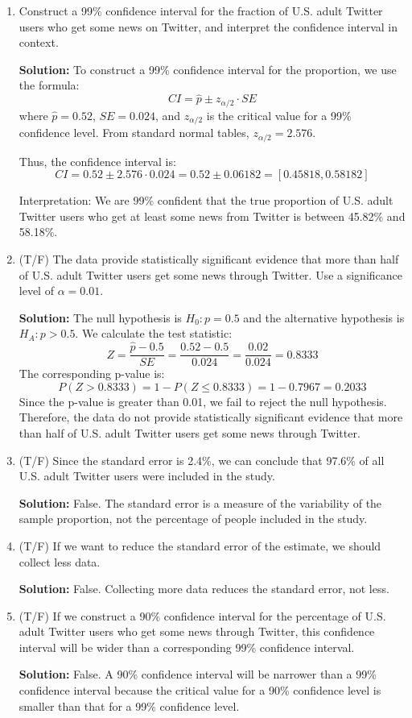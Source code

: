 \documentclass[12pt]{article}
\begin{document}
\begin{enumerate}
    \item Construct a 99\% confidence interval for the fraction of U.S. adult Twitter users who get some news on Twitter, and interpret the confidence interval in context.

\textbf{Solution:}
To construct a 99\% confidence interval for the proportion, we use the formula:
\[
CI = \hat{p} \pm z_{\alpha/2} \cdot SE
\]
where \( \hat{p} = 0.52 \), \( SE = 0.024 \), and \( z_{\alpha/2} \) is the critical value for a 99\% confidence level. From standard normal tables, \( z_{\alpha/2} = 2.576 \).

Thus, the confidence interval is:
\[
CI = 0.52 \pm 2.576 \cdot 0.024 = 0.52 \pm 0.06182 = [0.45818, 0.58182]
\]

Interpretation: We are 99\% confident that the true proportion of U.S. adult Twitter users who get at least some news from Twitter is between 45.82\% and 58.18\%.

\item (T/F) The data provide statistically significant evidence that more than half of U.S. adult Twitter users get some news through Twitter. Use a significance level of \( \alpha = 0.01 \).

\textbf{Solution:}
The null hypothesis is \( H_0: p = 0.5 \) and the alternative hypothesis is \( H_A: p > 0.5 \). We calculate the test statistic:
\[
Z = \frac{\hat{p} - 0.5}{SE} = \frac{0.52 - 0.5}{0.024} = \frac{0.02}{0.024} = 0.8333
\]
The corresponding p-value is:
\[
P(Z > 0.8333) = 1 - P(Z \leq 0.8333) = 1 - 0.7967 = 0.2033
\]
Since the p-value is greater than 0.01, we fail to reject the null hypothesis. Therefore, the data do not provide statistically significant evidence that more than half of U.S. adult Twitter users get some news through Twitter.

\item (T/F) Since the standard error is 2.4\%, we can conclude that 97.6\% of all U.S. adult Twitter users were included in the study.

\textbf{Solution:}
False. The standard error is a measure of the variability of the sample proportion, not the percentage of people included in the study.

\item  (T/F) If we want to reduce the standard error of the estimate, we should collect less data.

\textbf{Solution:}
False. Collecting more data reduces the standard error, not less.

\item  (T/F) If we construct a 90\% confidence interval for the percentage of U.S. adult Twitter users who get some news through Twitter, this confidence interval will be wider than a corresponding 99\% confidence interval.

\textbf{Solution:}
False. A 90\% confidence interval will be narrower than a 99\% confidence interval because the critical value for a 90\% confidence level is smaller than that for a 99\% confidence level.
\end{enumerate}
\end{document}
